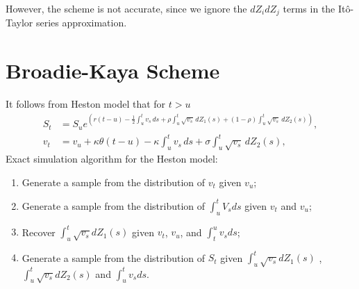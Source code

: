         However, the scheme is not accurate, since we ignore the $dZ_idZ_j$ terms in the It\^o-Taylor series approximation.

    \section{Broadie-Kaya Scheme}
    It follows from Heston model that for $t > u$
    \begin{align}
         S_t &= S_u e^{\left( r(t-u)-\frac{1}{2} \int_{u}^{t} v_s \, ds  + \rho\int_{u}^{t} \sqrt{v_s} \, dZ_1(s) + (1-\rho)\int_{u}^{t} \sqrt{v_s} \, dZ_2(s)  \right)}, \label{BK:Price_int} \\
         v_t &= v_u + \kappa\theta(t-u) - \kappa \int_{u}^{t} v_s \, ds + \sigma\int_{u}^{t} \sqrt{v_s} \, dZ_2(s), \label{BK:Vol_int}
    \end{align}
    Exact simulation algorithm for the Heston model:
    \begin{enumerate}
        \item Generate a sample from the distribution of $v_t$ given $v_u$;
        \item Generate a sample from the distribution of $\int_{u}^t V_s ds$ given $v_t$ and $v_u$;
        \item Recover $\int_{u}^t \sqrt{v_s} dZ_1(s)$ given $v_t$, $v_u$, and $\int_{t}^u v_s ds$;
        \item Generate a sample from the distribution of $S_t$ given $\int_{u}^t \sqrt{v_s} dZ_1(s)$ , $\int_{u}^t \sqrt{v_s} dZ_2(s)$ and $\int_{u}^t v_s ds$.
    \end{enumerate}

